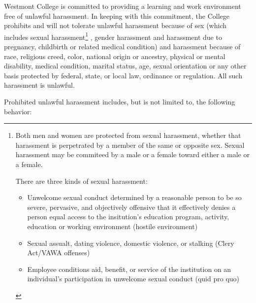 			Westmont College is committed to providing a learning and work environment free
			of unlawful harassment.  In keeping with this commitment, the College prohibits
			and will not tolerate unlawful harassment because of sex (which includes sexual
			harassment\footnote{
				Both men and women are protected from sexual harassment, whether that harassment
				is perpetrated by a member of the same or opposite sex.  Sexual harassment may be commiteed by a
				male or a female toward either a male or a female.

				There are three kinds of sexual harassment:
				\begin{itemize}
					\item{Unwelcome sexual conduct determined by a reasonable person to be so severe, pervasive,
						and objectively offensive that it effectively denies a person equal access to the insitution's
						education program, activity, education or working environment (hostile environment)}
					\item{Sexual assualt, dating violence, domestic violence, or stalking (Clery Act/VAWA offenses)}
					\item{Employee conditions aid, benefit, or service of the institution on an individual's participation
						in unwelcome sexual conduct (quid pro quo)}
				\end{itemize}

			}
			, gender harassment and harassment due to pregnancy, childbirth or
			related medical condition) and harassment because of race, religious creed,
			color, national origin or ancestry, physical or mental disability, medical
			condition, marital status, age, sexual orientation or any other basis protected
			by federal, state, or local law, ordinance or regulation.  All such harassment
			is unlawful.

			Prohibited unlawful harassment includes, but is not limited to, the
			following behavior:

